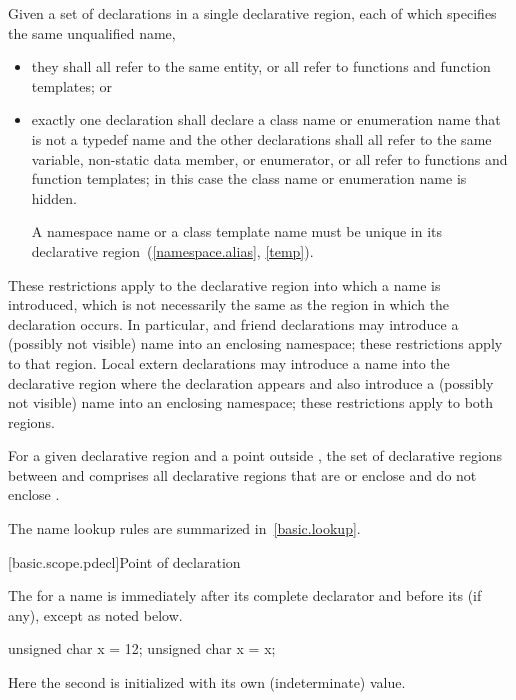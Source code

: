 \pnum
Given a set of declarations in a single declarative region, each of
which specifies the same unqualified name,
\begin{itemize}
\item they shall all refer to the same entity, or all refer to functions
and function templates; or
\item exactly one declaration shall declare a class name or enumeration
name that is not a typedef name and the other declarations shall
all refer to the same variable, non-static data member, or enumerator,
or all refer to functions and function templates;
in this case the class name or enumeration name is
hidden. \begin{note} A namespace name or a
class template name must be unique in its declarative
region~(\ref{namespace.alias}, \ref{temp}). \end{note}
\end{itemize}
\begin{note} These restrictions apply to the declarative region into which
a name is introduced, which is not necessarily the same as the region in
which the declaration occurs. In particular,
 and
friend declarations may introduce a (possibly not
visible) name into an enclosing namespace; these restrictions apply to
that region. Local extern declarations may introduce
a name into the declarative region where the declaration appears and
also introduce a (possibly not visible) name into an enclosing
namespace; these restrictions apply to both regions. \end{note}

\pnum
For a given declarative region 
and a point  outside ,
the set of  declarative regions
between  and 
comprises all declarative regions
that are or enclose  and do not enclose .

\pnum
\begin{note} The name lookup rules are summarized in~\ref{basic.lookup}.
\end{note}

[basic.scope.pdecl]{Point of declaration}

\pnum
{}%
The  for a name is immediately after its
complete declarator and before its
 (if any), except as noted below. \begin{example}

\begin{codeblock}
unsigned char x = 12;
{ unsigned char x = x; }
\end{codeblock}

Here the second  is initialized with its own (indeterminate)
value. \end{example}

